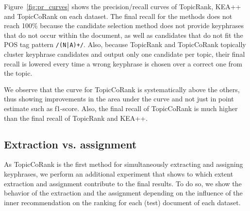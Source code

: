         

        Figure~\ref{fig:pr_curves} shows the precision/recall curves of TopicRank, KEA++ and TopicCoRank on each dataset.
        The final recall for the methods does not reach 100\% because the candidate selection method does not provide keyphrases that do not occur within the document, as well as candidates that do not fit the POS tag pattern \texttt{/(N|A)+/}.
        Also, because TopicRank and TopicCoRank topically cluster keyphrase candidates and output only one candidate per topic, their final recall is lowered every time a wrong keyphrase is chosen over a correct one from the topic.
 
        We observe that the curve for TopicCoRank is systematically above the others, thus showing improvements in the area under the curve and not just in point estimate such as f1-score.
        Also, the final recall of TopicCoRank is much higher than the final recall of TopicRank and KEA++.
       
      
    
    \subsection{Extraction vs. assignment}
    \label{subsec:assignment_vs_extraction}
        As TopicCoRank is the first method for simultaneously extracting and assigning key\-phrases, we perform an additional experiment that shows to which extent extraction and assignment contribute to the final results.
        To do so, we show the behavior of the extraction and the assignment depending on the influence of the inner recommendation on the ranking for each (test) document of each dataset.
        
